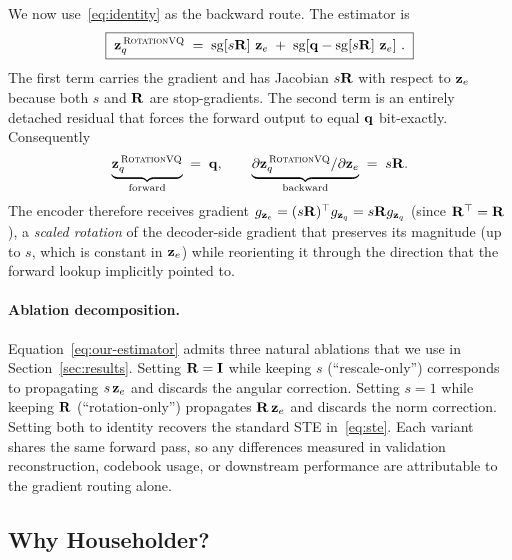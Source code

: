 We now use~\eqref{eq:identity} as the backward route. The estimator
is
\begin{equation}
  \boxed{\;\mathbf{z}_q^{\,\textsc{RotationVQ}} \;=\; \operatorname{sg}\!\left[s\mathbf{R}\right]\,\mathbf{z}_e \;+\; \operatorname{sg}\!\left[\mathbf{q} - \operatorname{sg}\!\left[s\mathbf{R}\right]\,\mathbf{z}_e\right]\,.\;}
  \label{eq:our-estimator}
\end{equation}
The first term carries the gradient and has Jacobian $s\mathbf{R}$ with
respect to $\mathbf{z}_e$ because both $s$ and $\mathbf{R}$ are stop-gradients.
The second term is an entirely detached residual that forces the
forward output to equal $\mathbf{q}$ bit-exactly. Consequently
\begin{equation}
  \underbrace{\mathbf{z}_q^{\,\textsc{RotationVQ}}}_{\text{forward}} \;=\; \mathbf{q},
  \qquad
  \underbrace{\partial \mathbf{z}_q^{\,\textsc{RotationVQ}} / \partial \mathbf{z}_e}_{\text{backward}} \;=\; s\mathbf{R}.
  \label{eq:fwd-bwd}
\end{equation}
The encoder therefore receives gradient $g_{\mathbf{z}_e} = (s\mathbf{R})^\top
g_{\mathbf{z}_q} = s\mathbf{R} g_{\mathbf{z}_q}$ (since $\mathbf{R}^\top = \mathbf{R}$), a
\emph{scaled rotation} of the decoder-side gradient that preserves
its magnitude (up to $s$, which is constant in $\mathbf{z}_e$) while
reorienting it through the direction that the forward lookup
implicitly pointed to.

\paragraph{Ablation decomposition.}
Equation~\eqref{eq:our-estimator} admits three natural ablations that
we use in Section~\ref{sec:results}. Setting $\mathbf{R} = \mathbf{I}$
while keeping $s$ (``rescale-only'') corresponds to propagating
$s\,\mathbf{z}_e$ and discards the angular correction. Setting $s = 1$ while
keeping $\mathbf{R}$ (``rotation-only'') propagates $\mathbf{R}\,\mathbf{z}_e$ and
discards the norm correction. Setting both to identity recovers the
standard STE in~\eqref{eq:ste}. Each variant shares the same forward
pass, so any differences measured in validation reconstruction,
codebook usage, or downstream performance are attributable to the
gradient routing alone.

\subsection{Why Householder?}

